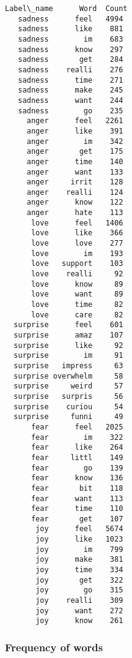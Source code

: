 \documentclass[8pt]{extarticle}
\begin{document}
    \begin{Verbatim}[commandchars=\\\{\}]
Label\_name      Word  Count
   sadness      feel   4994
   sadness      like    881
   sadness        im    683
   sadness      know    297
   sadness       get    284
   sadness    realli    276
   sadness      time    271
   sadness      make    245
   sadness      want    244
   sadness        go    235
     anger      feel   2261
     anger      like    391
     anger        im    342
     anger       get    175
     anger      time    140
     anger      want    133
     anger     irrit    128
     anger    realli    124
     anger      know    122
     anger      hate    113
      love      feel   1406
      love      like    366
      love      love    277
      love        im    193
      love   support    103
      love    realli     92
      love      know     89
      love      want     89
      love      time     82
      love      care     82
  surprise      feel    601
  surprise      amaz    107
  surprise      like     92
  surprise        im     91
  surprise   impress     63
  surprise overwhelm     58
  surprise     weird     57
  surprise   surpris     56
  surprise    curiou     54
  surprise     funni     49
      fear      feel   2025
      fear        im    322
      fear      like    264
      fear     littl    149
      fear        go    139
      fear      know    136
      fear       bit    118
      fear      want    113
      fear      time    110
      fear       get    107
       joy      feel   5674
       joy      like   1023
       joy        im    799
       joy      make    381
       joy      time    334
       joy       get    322
       joy        go    315
       joy    realli    309
       joy      want    272
       joy      know    261
    \end{Verbatim}

    \subsubsection{Frequency of words}\label{frequency-of-words}
\end{document}
